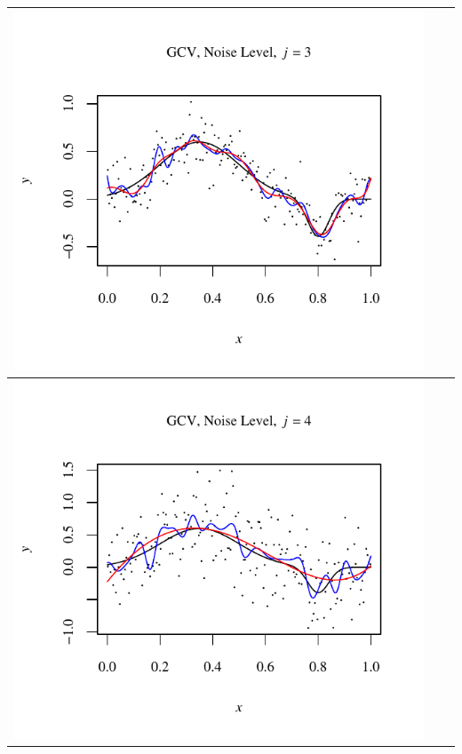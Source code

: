 \documentclass[11pt]{article}
\begin{document}
\begin{table}[h!]
\begin{center}
\begin{tabular}{| >{\centering\arraybackslash}m{2.1in} |  >{\centering\arraybackslash}m{2.1in} |  >{\centering\arraybackslash}m{2.1in}|}
      \includegraphics[width=1\linewidth,height=0.18\textheight]{Graphs/2/1/assignment5_a_2_1_3}\\\hline
      \includegraphics[width=1\linewidth,height=0.18\textheight]{Graphs/2/1/assignment5_a_2_1_4}&

\end{tabular}
\end{center}
\end{table}
\end{document}
